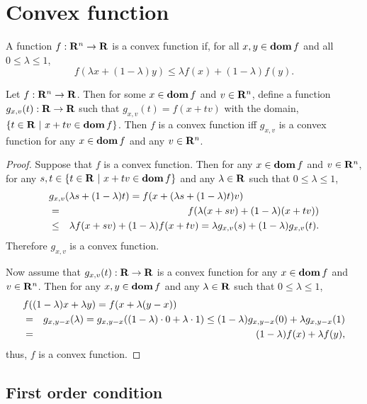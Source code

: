 \documentclass[10pt, twoside]{book}   	%
\begin{document}
\section{Convex function}

A function $f:\mathbf{R}^n\to\mathbf{R}$ is a convex function if, for all $x,y \in \mathop{\bf dom} f$ and all $0\leq \lambda \leq 1$,
\begin{equation}
f(\lambda x + (1-\lambda)y)
\leq
\lambda f(x) + (1-\lambda)f(y).
\end{equation}

\begin{theorem}
\label{theorem:cvx-equiv-1d-fcn}
Let $f:\mathbf{R}^n\to\mathbf{R}$.
Then for some $x\in\mathop{\bf dom} f$ and $v\in\mathbf{R}^n$,
define a function $g_{x,v}(t):\mathbf{R}\to\mathbf{R}$ such that $g_{x,v}(t) = f(x+tv)$
with the domain, $\{t\in\mathbf{R}~|~x+tv\in \mathop{\bf dom} f\}$.
Then $f$ is a convex function iff $g_{x,v}$ is a convex function for any $x\in\mathop{\bf dom} f$ and any $v\in\mathbf{R}^n$.
\end{theorem}

\begin{proof}
Suppose that $f$ is a convex function.
Then for any $x\in\mathop{\bf dom} f$ and $v\in\mathbf{R}^n$,
for any $s,t \in\{t\in\mathbf{R}~|~x+tv\in \mathop{\bf dom} f\}$ and any $\lambda\in\mathbf{R}$ such that $0\leq \lambda \leq 1$,
\begin{eqnarray*}
\lefteqn{
g_{x,v}(\lambda s + (1-\lambda) t)
=f(x+(\lambda s + (1-\lambda) t)v)
}
\\
&=&
f(\lambda (x+sv) + (1-\lambda) (x+tv))
\\
&\leq&
\lambda f(x+sv) + (1-\lambda) f(x+tv)
= \lambda g_{x,v}(s) + (1-\lambda) g_{x,v}(t).
\end{eqnarray*}
Therefore $g_{x,v}$ is a convex function.

Now assume that
$g_{x,v}(t):\mathbf{R}\to\mathbf{R}$ is a convex function for any $x\in\mathop{\bf dom} f$ and $v\in\mathbf{R}^n$.
Then for any $x,y \in \mathop{\bf dom} f$ and any $\lambda\in\mathbf{R}$ such that $0\leq \lambda \leq 1$,
\begin{eqnarray*}
\lefteqn{
f((1-\lambda) x + \lambda y ) =f(x + \lambda (y-x) )
}
\\
&=&
g_{x,y-x}(\lambda)
= g_{x,y-x}((1-\lambda)\cdot 0 + \lambda \cdot 1)
\leq (1-\lambda) g_{x,y-x}(0) + \lambda g_{x,y-x}(1)
\\
&=&
(1-\lambda) f(x) + \lambda f(y),
\end{eqnarray*}
thus, $f$ is a convex function.
\end{proof}

\subsection{First order condition}
\end{document}
